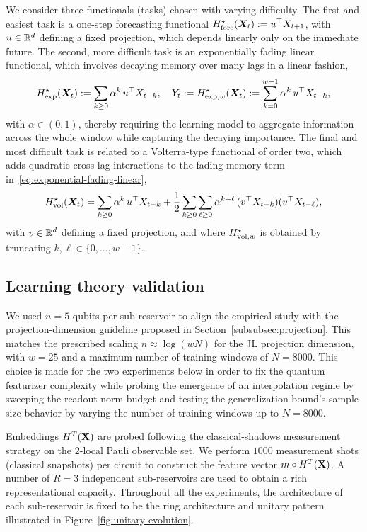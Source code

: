 We consider three functionals (tasks) chosen with varying difficulty. The first and easiest task is a one-step forecasting functional $H^\star_{\rm fore}(\boldsymbol{X}_t) := u^\top X_{t+1}$, with $u \in {\mathbb{R}}^d$ defining a fixed projection, which depends linearly only on the immediate future. The second, more difficult task is an exponentially fading linear functional, which involves decaying memory over many lags in a linear fashion,
\begin{equation}\label{eq:exponential-fading-linear}
    H^\star_{\rm exp}(\boldsymbol{X}_t)
    := \sum_{k\geq0}\alpha^k\, u^\top X_{t-k},
    \quad
    Y_t := H^\star_{{\rm exp},w}(\boldsymbol{X}_t)
    := \sum_{k=0}^{w-1}\alpha^k\, u^\top X_{t-k},
\end{equation}
with $\alpha \in (0,1)$, thereby requiring the learning model to aggregate information across the whole window while capturing the decaying importance. The final and most difficult task is related to a Volterra-type functional of order two, which adds quadratic cross-lag interactions to the fading memory term in~\cref{eq:exponential-fading-linear},
\begin{equation}\label{eq:volterra-functional}
    H^\star_{\rm vol}(\boldsymbol{X}_t)
    = \sum_{k\geq0}\alpha^k\, u^\top X_{t-k}
    + \frac{1}{2}\sum_{k\geq0}\sum_{\ell\geq0}\alpha^{k+\ell}\,
    (v^\top X_{t-k})(v^\top X_{t-\ell}),
\end{equation}
with $v  \in {\mathbb{R}}^d$ defining a fixed projection, and where $H^\star_{{\rm vol}, w}$ is obtained by truncating $k,\ell \in \{0, \ldots, w-1\}$.

\subsection{Learning theory validation}
We used $n = 5$ qubits per sub-reservoir to align the empirical study with the projection-dimension guideline proposed in Section~\ref{subsubsec:projection}. This matches the prescribed scaling $n \approx \log(w N)$ for the JL projection dimension, with $w = 25$ and a maximum number of training windows of $N=8000$. This choice is made for the two experiments below in order to fix the quantum featurizer complexity while probing the emergence of an interpolation regime by sweeping the readout norm budget and testing the generalization bound's sample-size behavior by varying the number of training windows up to $N=8000$.

Embeddings $H^T({\mathbf{X}})$ are probed following the classical-shadows measurement strategy on the $2$-local Pauli observable set. We perform $1000$ measurement shots (classical snapshots) per circuit to construct the feature vector $m \circ H^T({\mathbf{X}})$. 
A number of $R=3$ independent sub-reservoirs are used to obtain a rich representational capacity. Throughout all the experiments, the architecture of each sub-reservoir is fixed to be the ring architecture and unitary pattern illustrated in Figure~\ref{fig:unitary-evolution}.


